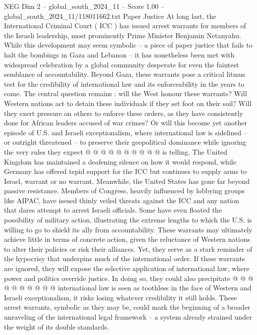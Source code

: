 \begin{textsample}{NEG Dim 2 – global\_south\_2024\_11 – Score 1.00 – global\_south\_2024\_11/118011662.txt}  \label{ex:f2_neg_267}
Paper Justice At long last, the International Criminal Court ( ICC ) has issued arrest warrants for members of the Israeli leadership, most prominently Prime Minister Benjamin Netanyahu.
While this development may seem symbolic -- a piece of paper justice that fails to halt the bombings in Gaza and Lebanon -- it has nonetheless been met with widespread celebration by a global community desperate for even the faintest semblance of accountability.
Beyond Gaza, these warrants pose a critical litmus test for the credibility of international law and its enforceability in the years to come.
The central question remains : will the West honour these warrants?
Will Western nations act to detain these individuals if they set foot on their soil?
Will they exert pressure on others to enforce these orders, as they have consistently done for African leaders accused of war crimes?
Or will this become yet another episode of U.S. and Israeli exceptionalism, where international law is sidelined -- or outright threatened -- to preserve their geopolitical dominance while ignoring the very rules they expect @ @ @ @ @ @ @ @ @ @ is telling.
The United Kingdom has maintained a deafening silence on how it would respond, while Germany has offered tepid support for the ICC but continues to supply arms to Israel, warrant or no warrant.
Meanwhile, the United States has gone far beyond passive resistance.
Members of Congress, heavily influenced by lobbying groups like AIPAC, have issued thinly veiled threats against the ICC and any nation that dares attempt to arrest Israeli officials.
Some have even floated the possibility of military action, illustrating the extreme lengths to which the U.S. is willing to go to shield its ally from accountability.
These warrants may ultimately achieve little in terms of concrete action, given the reluctance of Western nations to alter their policies or risk their alliances.
Yet, they serve as a stark reminder of the hypocrisy that underpins much of the international order.
If these warrants are ignored, they will expose the selective application of international law, where power and politics override justice.
In doing so, they could also precipitate @ @ @ @ @ @ @ @ @ @ international law is seen as toothless in the face of Western and Israeli exceptionalism, it risks losing whatever credibility it still holds.
These arrest warrants, symbolic as they may be, could mark the beginning of a broader unraveling of the international legal framework -- a system already strained under the weight of its double standards.

\end{textsample}
